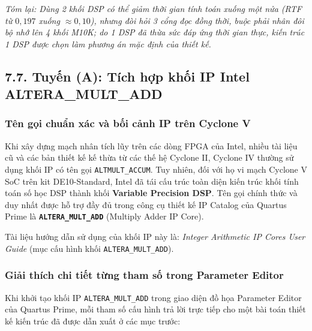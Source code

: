 \textit{Tóm lại: Dùng 2 khối DSP có thể giảm thời gian tính toán xuống một nửa (RTF từ $0{,}197$ xuống $\approx 0{,}10$), nhưng đòi hỏi 3 cổng đọc đồng thời, buộc phải nhân đôi bộ nhớ lên 4 khối M10K; do 1 DSP đã thừa sức đáp ứng thời gian thực, kiến trúc 1 DSP được chọn làm phương án mặc định của thiết kế.}


\subsection*{7.7. Tuyến (A): Tích hợp khối IP Intel ALTERA\_MULT\_ADD}

\subsubsection*{Tên gọi chuẩn xác và bối cảnh IP trên Cyclone V}
Khi xây dựng mạch nhân tích lũy trên các dòng FPGA của Intel, nhiều tài liệu cũ và các bản thiết kế kế thừa từ các thế hệ Cyclone II, Cyclone IV thường sử dụng khối IP có tên gọi \texttt{ALTMULT\_ACCUM}. Tuy nhiên, đối với họ vi mạch Cyclone V SoC trên kit DE10-Standard, Intel đã tái cấu trúc toàn diện kiến trúc khối tính toán số học DSP thành khối \textbf{Variable Precision DSP}. Tên gọi chính thức và duy nhất được hỗ trợ đầy đủ trong công cụ thiết kế IP Catalog của Quartus Prime là \textbf{\texttt{ALTERA\_MULT\_ADD}} (Multiply Adder IP Core).

Tài liệu hướng dẫn sử dụng của khối IP này là: \emph{Integer Arithmetic IP Cores User Guide} (mục cấu hình khối \texttt{ALTERA\_MULT\_ADD}).

\subsubsection*{Giải thích chi tiết từng tham số trong Parameter Editor}
Khi khởi tạo khối IP \texttt{ALTERA\_MULT\_ADD} trong giao diện đồ họa Parameter Editor của Quartus Prime, mỗi tham số cấu hình trả lời trực tiếp cho một bài toán thiết kế kiến trúc đã được dẫn xuất ở các mục trước:

